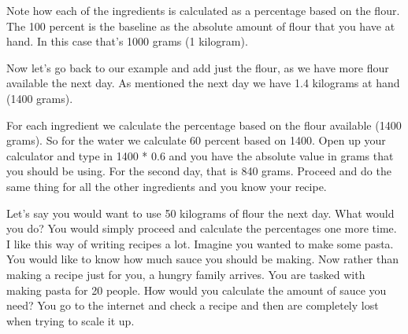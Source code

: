 Note how each of the ingredients is calculated as a percentage
based on the flour. The 100 percent is the baseline as the absolute
amount of flour that you have at hand. In this case that's 1000 grams
(1 kilogram).

Now let's go back to our example and add just the flour, as we have
more flour available the next day. As mentioned the next day
we have 1.4 kilograms at hand (1400 grams).

\begin{table}[H]
\centering
{}
\end{table}

For each ingredient we calculate the percentage
based on the flour available (1400 grams). So for the water
we calculate 60 percent based on 1400. Open up your
calculator and type in 1400 * 0.6 and you have
the absolute value in grams that you should be using.
For the second day, that is 840 grams. Proceed and do the same
thing for all the other ingredients and you know
your recipe.

Let's say you would want to use 50 kilograms of flour
the next day. What would you do? You would simply proceed
and calculate the percentages one more time. I like this
way of writing recipes a lot. Imagine you wanted to make
some pasta. You would like to know how much sauce you should
be making. Now rather than making a recipe just for you, a
hungry family arrives. You are tasked with making pasta
for 20 people. How would you calculate the amount of sauce
you need? You go to the internet and check a recipe and then
are completely lost when trying to scale it up.

